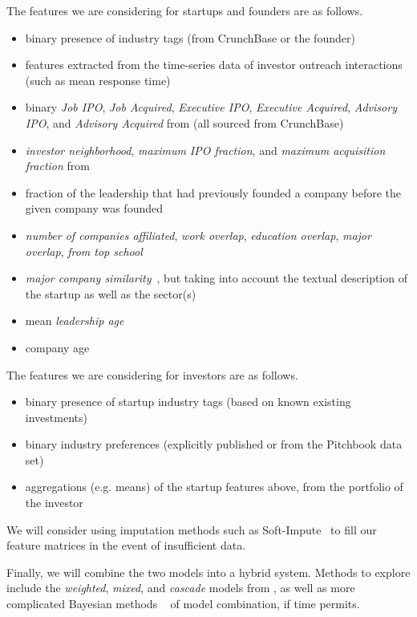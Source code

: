 The features we are considering for startups and founders are as follows.

\begin{itemize}
  \item binary presence of industry tags (from CrunchBase or the founder)
  \item features extracted from the time-series data of investor outreach interactions (such as mean response time)
  \item binary \textit{Job IPO}, \textit{Job Acquired}, \textit{Executive IPO}, \textit{Executive Acquired}, \textit{Advisory IPO}, and \textit{Advisory Acquired} from \cite{2017arXiv170604229H} (all sourced from CrunchBase)
  \item \textit{investor neighborhood}, \textit{maximum IPO fraction}, and \textit{maximum acquisition fraction} from \cite{2017arXiv170604229H}
  \item fraction of the leadership that had previously founded a company before the given company was founded~\cite{2017arXiv170604229H}
  \item \textit{number of companies affiliated}, \textit{work overlap}, \textit{education overlap}, \textit{major overlap}, \textit{from top school}~\cite{2017arXiv170604229H}
  \item \textit{major company similarity}~\cite{2017arXiv170604229H}, but taking into account the textual description of the startup as well as the sector(s)
  \item mean \textit{leadership age}~\cite{2017arXiv170604229H}
  \item company age
\end{itemize}

The features we are considering for investors are as follows.

\begin{itemize}
  \item binary presence of startup industry tags (based on known existing investments)
  \item binary industry preferences (explicitly published or from the Pitchbook data set)
  \item aggregations (e.g. means) of the startup features above, from the portfolio of the investor
\end{itemize}

We will consider using imputation methods such as Soft-Impute~\cite{mazumder2010spectral} to fill our feature matrices in the event of insufficient data.

Finally, we will combine the two models into a hybrid system. Methods to explore include the \textit{weighted}, \textit{mixed}, and \textit{cascade} models from \cite{Burke2002}, as well as more complicated Bayesian methods ~\cite{DECAMPOS2010785} of model combination, if time permits.
